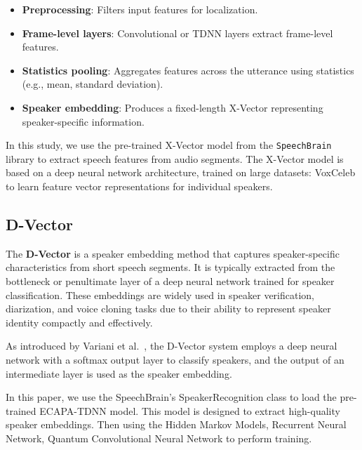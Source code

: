\documentclass[conference]{IEEEtran}
\begin{document}
\begin{itemize} \item \textbf{Preprocessing}: Filters input features for localization.
    \item \textbf{Frame-level layers}: Convolutional or TDNN layers extract
          frame-level features. \item \textbf{Statistics pooling}: Aggregates
          features across the utterance using statistics (e.g., mean, standard deviation).
    \item \textbf{Speaker embedding}: Produces a fixed-length X-Vector
          representing speaker-specific information. \end{itemize}


In this study, we use the pre-trained X-Vector model from the \texttt{SpeechBrain}
library to extract speech features from audio segments. The X-Vector model
is based on a deep neural network architecture, trained on large
datasets: VoxCeleb to learn feature vector representations
for individual speakers.




\subsection{D-Vector}

The \textbf{D-Vector} is a speaker embedding method that captures speaker-specific
characteristics from short speech segments. It is typically extracted from the
bottleneck or penultimate layer of a deep neural network trained for speaker
classification. These embeddings are widely used in speaker verification,
diarization, and voice cloning tasks due to their ability to represent speaker
identity compactly and effectively.

As introduced by Variani et al.~\cite{variani2014deep}, the D-Vector system employs
a deep neural network with a softmax output layer to classify speakers, and the
output of an intermediate layer is used as the speaker embedding.


In this paper, we use the SpeechBrain's SpeakerRecognition class to load the pre-trained
ECAPA-TDNN model. This model is designed to extract high-quality speaker embeddings.
Then using the Hidden Markov Models, Recurrent Neural Network,
Quantum Convolutional Neural Network to perform training.
\end{document}
